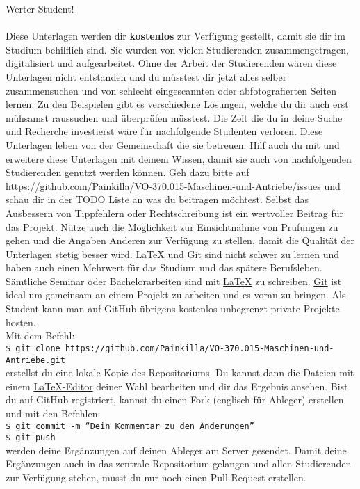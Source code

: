 \newpage %
	Werter Student!\\
	\\
	Diese Unterlagen werden dir \textbf{kostenlos} zur Verfügung gestellt, damit sie dir im Studium behilflich sind.
	Sie wurden von vielen Studierenden zusammengetragen, digitalisiert und aufgearbeitet.
	Ohne der Arbeit der Studierenden wären diese Unterlagen nicht entstanden und du müsstest dir jetzt alles selber zusammensuchen und von schlecht eingescannten oder abfotografierten Seiten lernen.
	Zu den Beispielen gibt es verschiedene Lösungen, welche du dir auch erst mühsamst raussuchen und überprüfen müsstest.
	Die Zeit die du in deine Suche und Recherche investierst wäre für nachfolgende Studenten verloren. Diese Unterlagen leben von der Gemeinschaft die sie betreuen.
	Hilf auch du mit und erweitere diese Unterlagen mit deinem Wissen, damit sie auch von nachfolgenden Studierenden genutzt werden können.
	Geh dazu bitte auf \href{https://github.com/Painkilla/VO-370.015-Maschinen-und-Antriebe/issues}{https://github.com/Painkilla/VO-370.015-Maschinen-und-Antriebe/issues} und schau dir in der TODO Liste an was du beitragen möchtest.
	Selbst das Ausbessern von Tippfehlern oder Rechtschreibung ist ein wertvoller Beitrag für das Projekt. Nütze auch die Möglichkeit zur Einsichtnahme von Prüfungen zu gehen und die Angaben Anderen zur Verfügung zu stellen, damit die Qualität der Unterlagen stetig besser wird.
	\href{https://www.latex-project.org/get/}{\LaTeX} und \href{https://git-scm.com/downloads}{Git} sind nicht schwer zu lernen und haben auch einen Mehrwert für das Studium und das spätere Berufsleben.
	Sämtliche Seminar oder Bachelorarbeiten sind mit \href{https://www.latex-project.org/get/}{\LaTeX} zu schreiben. \href{https://git-scm.com/downloads}{Git} ist ideal um gemeinsam an einem Projekt zu arbeiten und es voran zu bringen.
	Als Student kann man auf GitHub übrigens kostenlos unbegrenzt private Projekte hosten.\\
	Mit dem Befehl:\\
	\texttt{\$ git clone https://github.com/Painkilla/VO-370.015-Maschinen-und-Antriebe.git}\\
	erstellst du eine lokale Kopie des Repositoriums. Du kannst dann die Dateien mit einem \href{https://www.latex-project.org/get/}{\LaTeX-Editor} deiner Wahl bearbeiten und dir das Ergebnis ansehen.
	Bist du auf GitHub registriert, kannst du einen Fork (englisch für Ableger) erstellen und mit den Befehlen:\\
	\texttt{\$ git commit -m ``Dein Kommentar zu den Änderungen''}\\
	\texttt{\$ git push}\\
	werden deine Ergänzungen auf deinen Ableger am Server gesendet. Damit deine Ergänzungen auch in das zentrale Repositorium gelangen und allen Studierenden zur Verfügung stehen, musst du nur noch einen Pull-Request erstellen.
	\newpage